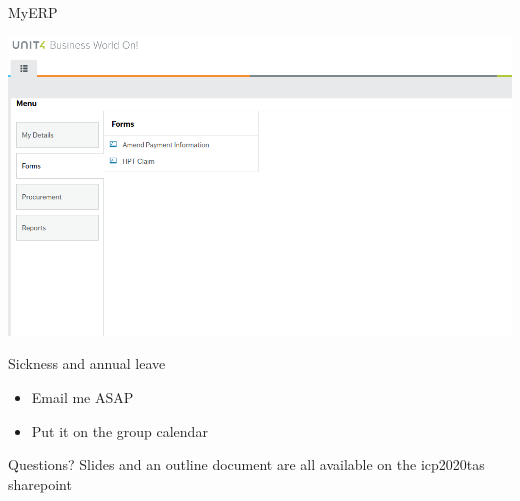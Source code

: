 \documentclass[presentation]{beamer}
\begin{document}
\begin{frame}[label={sec:orgc7d44f9}]{MyERP}
\begin{center}
\includegraphics[width=.9\linewidth]{./icp_claim.png}
\end{center}
\end{frame}

\begin{frame}[label={sec:org2c9d7d4}]{Sickness and annual leave}
\begin{itemize}
\item Email me ASAP
\end{itemize}
\vfill
\begin{itemize}
\item Put it on the group calendar
\end{itemize}
\end{frame}

\begin{frame}[label={sec:orgbfc7b1d}]{Questions?}
Slides and an outline document are all available on the icp2020tas sharepoint
\end{frame}
\end{document}
